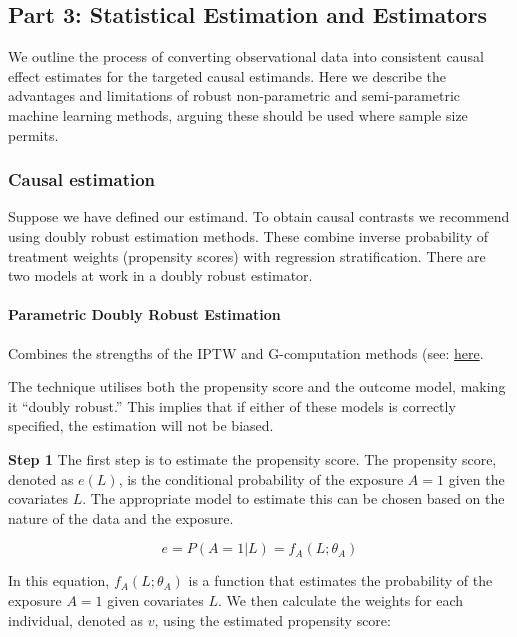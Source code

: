 \documentclass[
  singlecolumn]{article}
\let\oldparagraph\paragraph
\renewcommand{\paragraph}[1]{\oldparagraph{#1}\mbox{}}
\begin{document}
\newpage{}

\subsection{Part 3: Statistical Estimation and
Estimators}\label{part-3-statistical-estimation-and-estimators}

We outline the process of converting observational data into consistent
causal effect estimates for the targeted causal estimands. Here we
describe the advantages and limitations of robust non-parametric and
semi-parametric machine learning methods, arguing these should be used
where sample size permits.

\subsubsection{Causal estimation}\label{causal-estimation}

Suppose we have defined our estimand. To obtain causal contrasts we
recommend using doubly robust estimation methods. These combine inverse
probability of treatment weights (propensity scores) with regression
stratification. There are two models at work in a doubly robust
estimator.

\paragraph{Parametric Doubly Robust
Estimation}\label{parametric-doubly-robust-estimation}

Combines the strengths of the IPTW and G-computation methods (see:
\href{https://go-bayes.github.io/psych-434-2023/content/09-content.html\#comprehensive-checklist-for-detailed-reporting-of-a-causal-inferenctial-study-e.g.-assessment-3-option-2}{here}.

The technique utilises both the propensity score and the outcome model,
making it ``doubly robust.'' This implies that if either of these models
is correctly specified, the estimation will not be biased.

\textbf{Step 1} The first step is to estimate the propensity score. The
propensity score, denoted as \(e(L)\), is the conditional probability of
the exposure \(A = 1\) given the covariates \(L\). The appropriate model
to estimate this can be chosen based on the nature of the data and the
exposure.

\[e = P(A = 1 | L) = f_A(L; \theta_A)\]

In this equation, \(f_A(L; \theta_A)\) is a function that estimates the
probability of the exposure \(A = 1\) given covariates \(L\). We then
calculate the weights for each individual, denoted as \(v\), using the
estimated propensity score:
\end{document}
